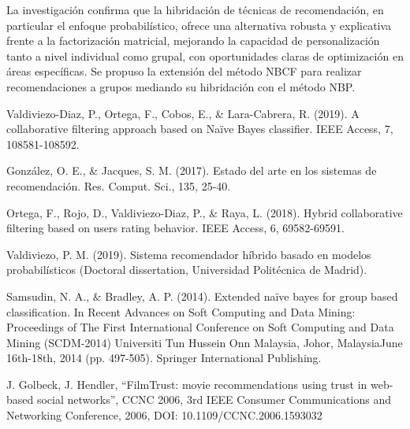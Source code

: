 \documentclass[runningheads,a4paper]{llncs}
\begin{document}
La investigación confirma que la hibridación de técnicas de recomendación, en particular el enfoque probabilístico, ofrece una alternativa robusta y explicativa frente a la factorización matricial, mejorando la capacidad de personalización tanto a nivel individual como grupal, con oportunidades claras de optimización en áreas específicas. Se propuso la extensión del método NBCF para realizar recomendaciones a grupos mediando su hibridación con el método NBP.

\renewcommand\refname{Referencias}

\begin{thebibliography}{4}

    Valdiviezo-Diaz, P., Ortega, F., Cobos, E., \& Lara-Cabrera, R. (2019). A collaborative filtering approach based on Naïve Bayes classifier. IEEE Access, 7, 108581-108592.
    
    González, O. E., \& Jacques, S. M. (2017). Estado del arte en los sistemas de recomendación. Res. Comput. Sci., 135, 25-40.
    
    Ortega, F., Rojo, D., Valdiviezo-Diaz, P., \& Raya, L. (2018). Hybrid collaborative filtering based on users rating behavior. IEEE Access, 6, 69582-69591.
    
    Valdiviezo, P. M. (2019). Sistema recomendador híbrido basado en modelos probabilísticos (Doctoral dissertation, Universidad Politécnica de Madrid).

    Samsudin, N. A., \& Bradley, A. P. (2014). Extended naïve bayes for group based classification. In Recent Advances on Soft Computing and Data Mining: Proceedings of The First International Conference on Soft Computing and Data Mining (SCDM-2014) Universiti Tun Hussein Onn Malaysia, Johor, MalaysiaJune 16th-18th, 2014 (pp. 497-505). Springer International Publishing.

    J. Golbeck, J. Hendler, “FilmTrust: movie recommendations using trust in web-based social networks”, CCNC 2006, 3rd IEEE Consumer Communications and Networking Conference, 2006, DOI: 10.1109/CCNC.2006.1593032 
    
\end{thebibliography}
    
\end{document}
